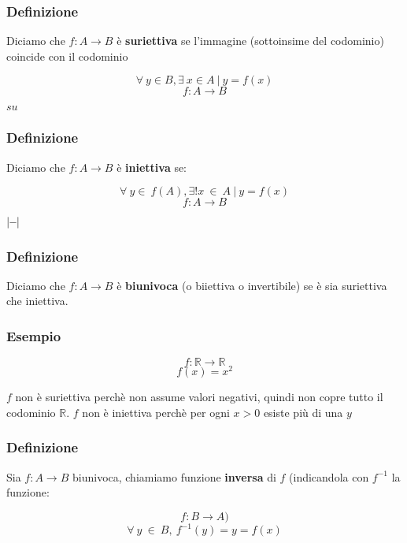 \subsubsection*{Definizione}
Diciamo che $f:A\rightarrow B$ è \textbf{suriettiva} se l'immagine (sottoinsime del codominio) coincide
con il codominio
\begin{large}
\[
    \forall\ y \in B, \exists\ x \in A\ |\ y = f(x)    
\]
\[
    f:A \rightarrow B
\]
\end{large}
\vspace{-7ex}
\begin{center}
\begin{small}
    \hspace{0.5cm}$su$
\end{small}
\end{center}
\subsubsection*{Definizione}
Diciamo che $f:A\rightarrow B$ è \textbf{iniettiva} se:
\begin{large}
\[
    \forall\ y \in\ f(A), \exists! x\ \in\ A\ |\ y = f(x)    
\]
\[
    f:A \rightarrow B    
\]
\end{large}
\vspace{-7ex}
\begin{center}
\begin{small}
    \hspace{0.5cm}$|\text{\hspace{-0.1cm}}-\text{\hspace{-0.1cm}}|$
\end{small}
\end{center}
\subsubsection*{Definizione}
Diciamo che $f:A\rightarrow B$ è \textbf{biunivoca} (o biiettiva o invertibile) se è sia suriettiva che iniettiva.

\subsubsection*{Esempio}
\[f: \mathbb{R} \rightarrow \mathbb{R}\]
\[f(x) = x^{2}\]

$f$ non è suriettiva perchè non assume valori negativi, quindi non copre tutto il codominio $\mathbb{R}$.
$f$ non è iniettiva perchè per ogni $x > 0$ esiste più di una $y$

\subsubsection*{Definizione}
Sia $f: A\rightarrow B$ biunivoca, chiamiamo funzione \textbf{inversa} di $f$ (indicandola con $f^{-1}$ la funzione:
\begin{Large}
\[
    f:B \rightarrow A)
\]
\[
    \forall\ y\ \in\ B,\ f^{-1}(y) = y = f(x)    
\]
\end{Large}

